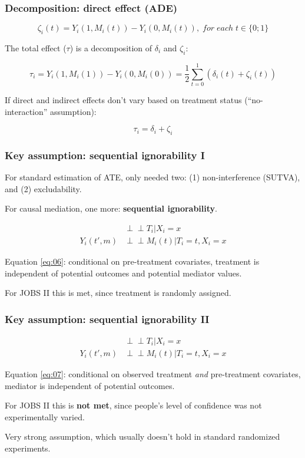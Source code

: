 \documentclass[11pt,english,dvipsnames,aspectratio=169,handout]{beamer}\usepackage[]{graphicx}\usepackage[]{xcolor}
\newcommand{\indep}{\perp \!\!\!\! \perp}
\begin{document}
\begin{frame}
	\frametitle{Decomposition: direct effect (ADE)}
	
	\begin{equation}
		\zeta_i(t) = Y_i(1, M_i(t)) - Y_i(0, M_i(t)),\; for\; each\; t\in \{0;1\}
	\end{equation}\pause
	
	The total effect ($\tau$) is a decomposition of $\delta_i$ and $\zeta_i$:
	
	\begin{equation}
		\tau_i = Y_i(1, M_i(1)) - Y_i(0, M_i(0)) = \frac{1}{2}\sum_{t=0}^{1}(\delta_i(t) + \zeta_i(t))
	\end{equation}\pause

	If direct and indirect effects don't vary based on treatment status (``no-interaction'' assumption):
	
	\begin{equation}
		\tau_i = \delta_i + \zeta_i
	\end{equation}	
	
\end{frame}


\begin{frame}
	\frametitle{Key assumption: sequential ignorability I}
	
	For standard estimation of ATE, only needed two: (1) non-interference (SUTVA), and (2) excludability.\bigskip
	
	For causal mediation, one more: \textbf{sequential ignorability}.\pause
	
	\begin{align}
		[Y_i(t', m), M_i(t)] &\indep T_i | X_i=x \label{eq:06} \\
		Y_i(t', m) &\indep M_i(t) | T_i=t, X_i=x \label{eq:07}
	\end{align}
	
	Equation \ref{eq:06}: conditional on pre-treatment covariates, treatment is independent of potential outcomes and potential mediator values.\bigskip
	\pause
	
	For JOBS II this is met, since treatment is randomly assigned.
	
\end{frame}


\begin{frame}
	\frametitle{Key assumption: sequential ignorability II}
	
	\begin{align}
		[Y_i(t', m), M_i(t)] &\indep T_i | X_i=x \label{eq:08} \\
		Y_i(t', m) &\indep M_i(t) | T_i=t, X_i=x \label{eq:09}
	\end{align}
	
	Equation \ref{eq:07}: conditional on observed treatment \textit{and} pre-treatment covariates, mediator is independent of potential outcomes.\bigskip
	\pause
	
	For JOBS II this is \textbf{not met}, since people's level of confidence was not experimentally varied.\bigskip
	\pause
	
	Very strong assumption, which usually doesn't hold in standard randomized experiments.
	
\end{frame}
\end{document}
